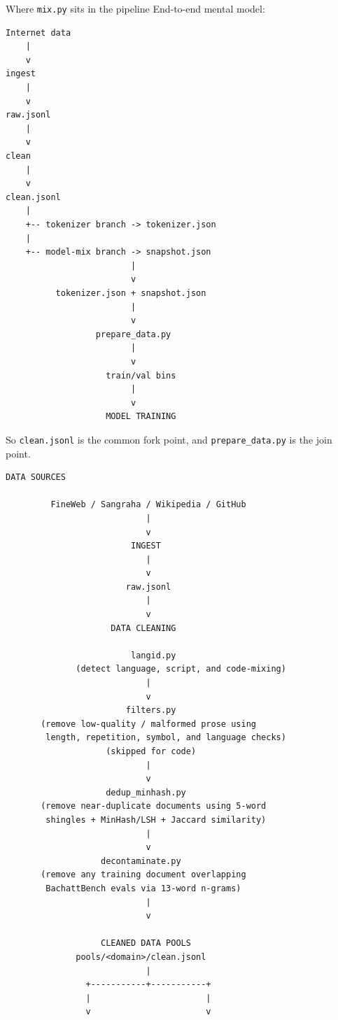 \begin{paragraphblock}{Where \texttt{mix.py} sits in the pipeline}
  End-to-end mental model:
\begin{lstlisting}[style=shadedpython,language={},basicstyle=\scriptsize\ttfamily]
Internet data
    |
    v
ingest
    |
    v
raw.jsonl
    |
    v
clean
    |
    v
clean.jsonl
    |
    +-- tokenizer branch -> tokenizer.json
    |
    +-- model-mix branch -> snapshot.json
                         |
                         v
          tokenizer.json + snapshot.json
                         |
                         v
                  prepare_data.py
                         |
                         v
                    train/val bins
                         |
                         v
                    MODEL TRAINING
\end{lstlisting}

  So \texttt{clean.jsonl} is the common fork point, and
  \texttt{prepare\_data.py} is the join point.

\begin{lstlisting}[style=shadedpython,language={},basicstyle=\scriptsize\ttfamily]
                        DATA SOURCES

         FineWeb / Sangraha / Wikipedia / GitHub
                            |
                            v
                         INGEST
                            |
                            v
                        raw.jsonl
                            |
                            v
                     DATA CLEANING

                         langid.py
              (detect language, script, and code-mixing)
                            |
                            v
                        filters.py
       (remove low-quality / malformed prose using
        length, repetition, symbol, and language checks)
                    (skipped for code)
                            |
                            v
                    dedup_minhash.py
       (remove near-duplicate documents using 5-word
        shingles + MinHash/LSH + Jaccard similarity)
                            |
                            v
                   decontaminate.py
       (remove any training document overlapping
        BachattBench evals via 13-word n-grams)
                            |
                            v

                   CLEANED DATA POOLS
              pools/<domain>/clean.jsonl
                            |
                +-----------+-----------+
                |                       |
                v                       v


\end{lstlisting}
\end{paragraphblock}

